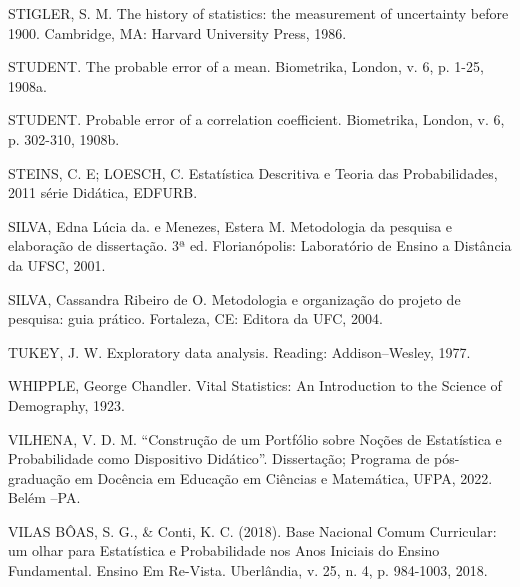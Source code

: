 STIGLER, S. M. The history of statistics: the measurement of uncertainty before 1900. Cambridge, MA: Harvard University Press, 1986. \vskip0.3cm

STUDENT. The probable error of a mean. Biometrika, London, v. 6, p. 1-25, 1908a.\vskip0.3cm

STUDENT. Probable error of a correlation coefficient. Biometrika, London, v. 6, p. 302-310, 1908b.\vskip0.3cm

STEINS, C. E; LOESCH, C. Estatística Descritiva e Teoria das Probabilidades, 2011 série Didática, EDFURB.\vskip0.3cm

SILVA, Edna Lúcia da. e Menezes, Estera M. Metodologia da pesquisa e elaboração de dissertação. 3ª ed. Florianópolis: Laboratório de Ensino a Distância da UFSC, 2001.\vskip0.3cm

SILVA, Cassandra Ribeiro de O. Metodologia e organização do projeto de pesquisa: guia prático. Fortaleza, CE: Editora da UFC, 2004.\vskip0.3cm

TUKEY, J. W. Exploratory data analysis. Reading: Addison–Wesley, 1977.\vskip0.3cm

WHIPPLE, George Chandler. Vital Statistics: An Introduction to the Science of Demography, 1923. \vskip0.3cm

VILHENA, V. D. M. “Construção de um Portfólio sobre Noções de Estatística e Probabilidade como Dispositivo Didático”. Dissertação; Programa de pós-graduação em Docência em Educação em Ciências e Matemática, UFPA, 2022. Belém –PA.\vskip0.3cm

 VILAS BÔAS, S. G., \& Conti, K. C. (2018). Base Nacional Comum Curricular: um olhar para Estatística e Probabilidade nos Anos Iniciais do Ensino Fundamental. Ensino Em Re-Vista. Uberlândia, v. 25, n. 4, p. 984-1003, 2018. \vskip0.3cm







